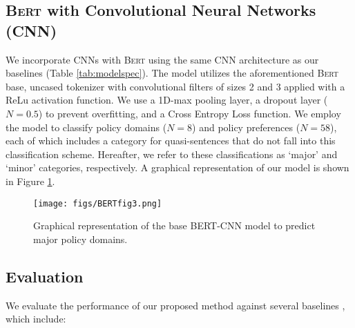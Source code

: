 \documentclass[11pt]{article}
\begin{document}
\subsection{\textsc{Bert} with Convolutional Neural Networks (CNN)}


We incorporate CNNs with \textsc{Bert} using the same CNN architecture as our baselines (Table \ref{tab:modelspec}).
The  model utilizes the aforementioned \textsc{Bert} base, uncased tokenizer with convolutional filters of sizes 2 and 3 applied with a ReLu activation function. We use a 1D-max pooling layer, a dropout layer ($N = 0.5$) to prevent overfitting, and a Cross Entropy Loss function.
We employ the model to classify policy domains ($N = 8$) and policy preferences ($N = 58$), each of which includes a category for quasi-sentences that do not fall into this classification scheme. Hereafter, we refer to these classifications as `major' and `minor' categories, respectively. A graphical representation of our model is shown in Figure \ref{fig:BERTCNNfig}.

\begin{figure}[h!]
 \centering
 \texttt{[image: figs/BERTfig3.png]}
 \caption{Graphical representation of the base BERT-CNN model to predict major policy domains.}
 \label{fig:BERTCNNfig}
\end{figure}


\subsection{Evaluation}
We evaluate the performance of our proposed method against several baselines%
, which include:
\end{document}
